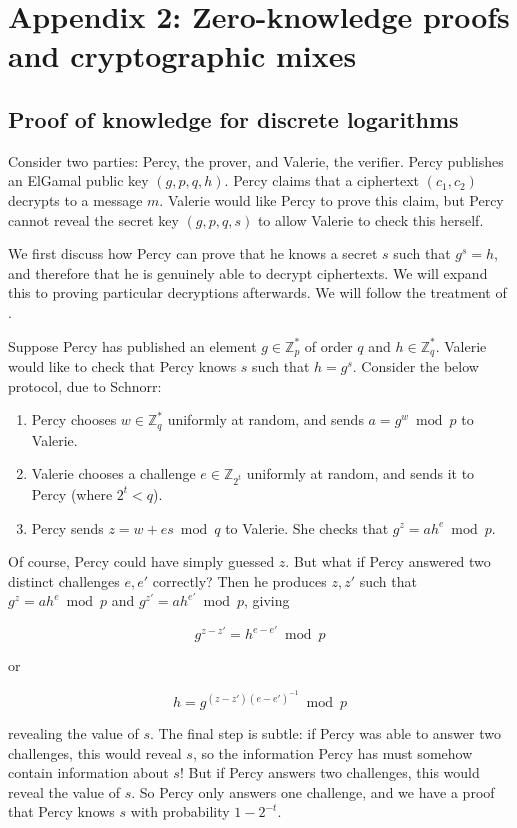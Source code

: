 \documentclass[11pt,twoside,a4paper]{article}
\theoremstyle{definition}
\begin{document}
\section{Appendix 2: Zero-knowledge proofs and cryptographic mixes}\label{app-proof}
\subsection{Proof of knowledge for discrete logarithms}
Consider two parties: Percy, the prover, and Valerie, the verifier. Percy publishes an ElGamal public key \((g,p,q,h)\). Percy claims that a ciphertext \((c_1, c_2)\) decrypts to a message \(m\). Valerie would like Percy to prove this claim, but Percy cannot reveal the secret key \((g,p,q,s)\) to allow Valerie to check this herself.

We first discuss how Percy can prove that he knows a secret \(s\) such that \(g^s=h\), and therefore that he is genuinely able to decrypt ciphertexts. We will expand this to proving particular decryptions afterwards. We will follow the treatment of \cite{damgaard2002sigma}.

Suppose Percy has published an element \(g\in\mathbb{Z}^*_p\) of order \(q\) and \(h\in\mathbb{Z}^*_q\). Valerie would like to check that Percy knows \(s\) such that \(h=g^s\). Consider the below protocol, due to Schnorr:
\begin{enumerate}
    \item Percy chooses \(w\in\mathbb{Z}^*_q\) uniformly at random, and sends \(a=g^w\bmod p\) to Valerie.
    \item Valerie chooses a challenge \(e\in\mathbb{Z}_{2^t}\) uniformly at random, and sends it to Percy (where \(2^t<q\)).
    \item Percy sends \(z=w+es\bmod q\) to Valerie. She checks that \(g^z=ah^e\bmod p\).
\end{enumerate}
Of course, Percy could have simply guessed \(z\). But what if Percy answered two distinct challenges \(e,e'\) correctly? Then he produces \(z,z'\) such that \(g^z=ah^e\bmod p\) and \(g^{z'}=ah^{e'}\bmod p\), giving

\[g^{z-z'}=h^{e-e'}\bmod p\]

or

\[h=g^{(z-z')(e-e')^{-1}}\bmod p\]

revealing the value of \(s\). The final step is subtle: if Percy was able to answer two challenges, this would reveal \(s\), so the information Percy has must somehow contain information about \(s\)! But if Percy answers two challenges, this would reveal the value of \(s\). So Percy only answers one challenge, and we have a proof that Percy knows \(s\) with  probability \(1-2^{-t}\).
\end{document}
